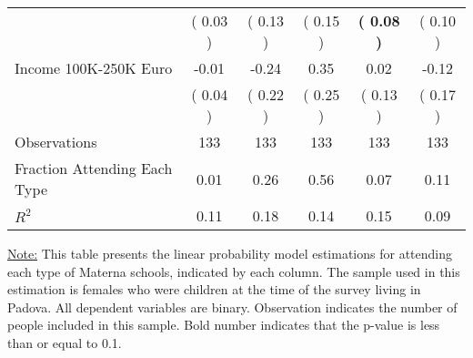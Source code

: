 \begin{table}[H]
{\begin{tabular}{lccccc}
\quad  & (     0.03 ) & (     0.13 )  & (     0.15 )  & \textbf{(     0.08 )} & (     0.10 ) \\
\quad Income 100K-250K Euro &     -0.01 &     -0.24 &      0.35 &      0.02 &     -0.12 \\
\quad  & (     0.04 ) & (     0.22 )  & (     0.25 )  & (     0.13 ) & (     0.17 ) \\
\midrule
Observations & 133 & 133 & 133 & 133 & 133 \\
Fraction Attending Each Type &      0.01 &      0.26 &      0.56 &      0.07 &      0.11 \\
\midrule
$ R^2$ &      0.11 &      0.18 &      0.14 &      0.15 &      0.09 \\
\bottomrule
\end{tabular}}
\end{table}
\begin{footnotesize}
\noindent\underline{Note:} This table presents the linear probability model estimations for attending each type of Materna schools, indicated by each column. The sample used in this estimation is females who were children at the time of the survey living in Padova. All dependent variables are binary. Observation indicates the number of people included in this sample. Bold number indicates that the p-value is less than or equal to 0.1.
\end{footnotesize}

